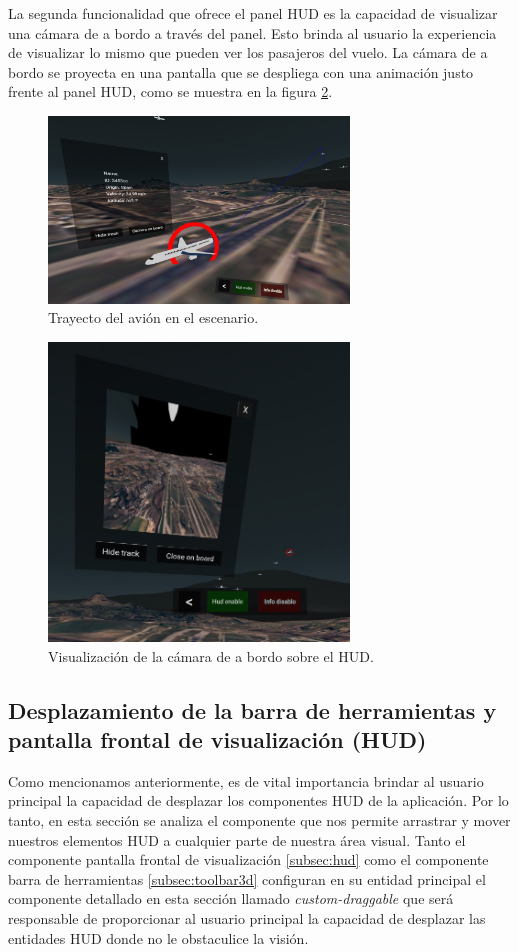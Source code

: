 \documentclass[a4paper, 11pt]{book}
\begin{document}
La segunda funcionalidad que ofrece el panel \textsc{\gls{HUD}} es la capacidad de visualizar una cámara de a bordo a través del panel. Esto brinda al usuario la experiencia de visualizar lo mismo que pueden ver los pasajeros del vuelo. La cámara de a bordo se proyecta en una pantalla que se despliega con una animación justo frente al panel \textsc{\gls{HUD}}, como se muestra en la figura \ref{fig:cameraOnBoard}.\\
\begin{figure}[h]
	\centering
	\includegraphics[width=8cm, keepaspectratio]{img/show_track.jpg}
	\caption{Trayecto del avión en el escenario.}
	\label{fig:showTrack}
\end{figure}
\begin{figure}[h]
  \centering
  \includegraphics[width=8cm, keepaspectratio]{img/cameraOnBoard.jpg}
  \caption{Visualización de la cámara de a bordo sobre el HUD.}
  \label{fig:cameraOnBoard}
\end{figure}
\subsection{Desplazamiento de la barra de herramientas y pantalla frontal de visualización (HUD)}
\label{subsec:customDraggable}
Como mencionamos anteriormente, es de vital importancia brindar al usuario principal la capacidad de desplazar los componentes \textsc{\gls{HUD}} de la aplicación. Por lo tanto, en esta sección se analiza el componente que nos permite arrastrar y mover nuestros elementos \textsc{\gls{HUD}} a cualquier parte de nuestra área visual.
Tanto el componente pantalla frontal de visualización \ref{subsec:hud} como el componente barra de herramientas \ref{subsec:toolbar3d} configuran en su entidad principal el componente detallado en esta sección llamado \emph{custom-draggable} que será responsable de proporcionar al usuario principal la capacidad de desplazar las entidades \textsc{HUD} donde no le obstaculice la visión.
\end{document}
